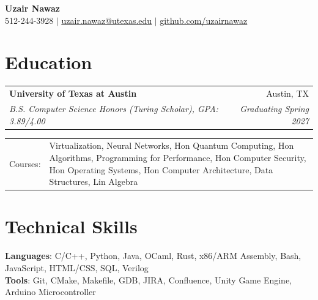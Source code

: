 \documentclass[letterpaper,11pt]{article}
\makeatletter
\newcommand{\resumeSubheading}[4]{
  \vspace{-2pt}\item
    \begin{tabular*}{0.97\textwidth}[t]{l@{\extracolsep{\fill}}r}
      \textbf{#1} & #2 \\
      \textit{\small#3} & \textit{\small #4} \\
    \end{tabular*}\vspace{-7pt}
}
\newcommand{\resumeSubHeadingListStart}{\begin{itemize}[leftmargin=0.15in, label={}]}
\newcommand{\resumeSubHeadingListEnd}{\end{itemize}}
\makeatother
\begin{document}
\begin{center}
    \textbf{\Huge Uzair Nawaz} \\ \vspace{1pt}
    \small 512-244-3928 $|$ \href{mailto:uzair.nawaz@utexas.edu}{\underline{uzair.nawaz@utexas.edu}} $|$ 
    \href{https://github.com/uzairnawaz}{\underline{github.com/uzairnawaz}}
\end{center}


\section{Education}
  \resumeSubHeadingListStart
    \resumeSubheading
      {University of Texas at Austin}{Austin, TX}
      {B.S. Computer Science Honors (Turing Scholar), GPA: 3.89/4.00}{Graduating Spring 2027}
      \vspace{-2pt}\small{\item
      \begin{tabularx}{0.97\textwidth}{p{1.6cm} X}
        Courses: & Virtualization, Neural Networks, Hon Quantum Computing, Hon Algorithms, Programming for Performance, Hon Computer Security, Hon Operating Systems, Hon Computer Architecture, Data Structures, Lin Algebra\\
      \end{tabularx}\vspace{-7pt}}
  \resumeSubHeadingListEnd

%
\section{Technical Skills}
 \begin{itemize}[leftmargin=0.15in, label={}]
    \small{\item{
     \textbf{Languages}{: C/C++, Python, Java, OCaml, Rust, x86/ARM Assembly, Bash, JavaScript, HTML/CSS, SQL, Verilog} \\
     \textbf{Tools}{: Git, CMake, Makefile, GDB, JIRA, Confluence, Unity Game Engine, Arduino Microcontroller} \\
    }}\vspace{-4pt}
 \end{itemize}
  
\end{document}
